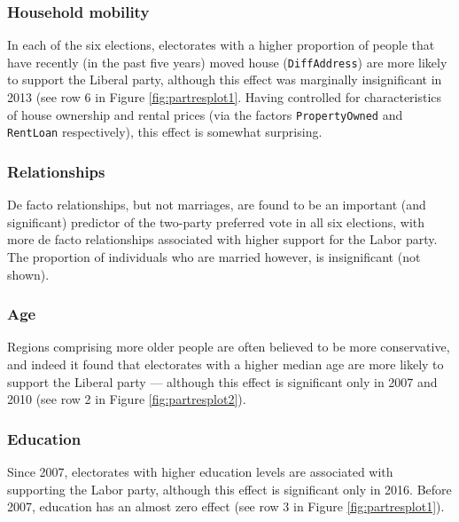 \documentclass[11pt,a4paper,]{article}
\begin{document}
\hypertarget{household-mobility}{%
\subsubsection{Household mobility}\label{household-mobility}}

In each of the six elections, electorates with a higher proportion of people that have recently (in the past five years) moved house (\texttt{DiffAddress}) are more likely to support the Liberal party, although this effect was marginally insignificant in 2013 (see row 6 in Figure \ref{fig:partresplot1}. Having controlled for characteristics of house ownership and rental prices (via the factors \texttt{PropertyOwned} and \texttt{RentLoan} respectively), this effect is somewhat surprising.

\hypertarget{relationships}{%
\subsubsection{Relationships}\label{relationships}}

De facto relationships, but not marriages, are found to be an important (and significant) predictor of the two-party preferred vote in all six elections, with more de facto relationships associated with higher support for the Labor party. The proportion of individuals who are married however, is insignificant (not shown).

\hypertarget{age-1}{%
\subsubsection{Age}\label{age-1}}

Regions comprising more older people are often believed to be more conservative, and indeed it found that electorates with a higher median age are more likely to support the Liberal party --- although this effect is significant only in 2007 and 2010 (see row 2 in Figure \ref{fig:partresplot2}).

\hypertarget{education}{%
\subsubsection{Education}\label{education}}

Since 2007, electorates with higher education levels are associated with supporting the Labor party, although this effect is significant only in 2016. Before 2007, education has an almost zero effect (see row 3 in Figure \ref{fig:partresplot1}).
\end{document}
